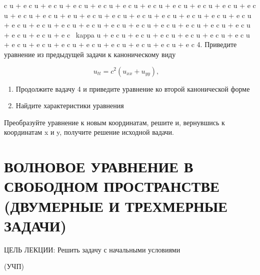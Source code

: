 \documentclass[
  ukrainian,
]{article}
\begin{document}
c \kappa u + e c \kappa u + e c \kappa u + e c \kappa u + e c \kappa u +
e c \kappa u + e c \kappa u + e c \kappa u + e c \kappa u + e c \kappa u
+ e c \kappa u + e c \kappa u + e c \kappa u + e u + e c \kappa u + e c
\kappa u + e c \kappa u + e c \kappa u + e c \kappa u + e c \kappa u + e
c \kappa u + e c \kappa u + e c \kappa u + e c \kappa u + e c \kappa u +
e c \kappa u + e c \kappa u + e c \kappa u + e c \kappa u + e c \kappa u
+ e c \kappa u + e c \kappa u + e c \kappa u + e c ~kappa u + e c
\kappa u + e c \kappa u + e c \kappa u + e c \kappa u + e c \kappa u + e
c \kappa u + e c \kappa u + e c \kappa u + e c \kappa u + e c \kappa u +
e c \kappa u + e c \kappa u + e c \kappa u + e c 4. Приведите уравнение
из предыдущей задачи к каноническому виду

\[
u_{tt} = c^2 (u_{xx} + u_{yy}), \quad
\]

\begin{enumerate}
\def\labelenumi{\arabic{enumi}.}
\setcounter{enumi}{4}
\item
  Продолжите вадачу 4 и приведите уравнение ко второй канонической форме
\item
  Найдите характеристики уравнения
\end{enumerate}

Преобразуйте уравнение к новым координатам, решите и, вернувшись к
координатам x и y, получите решение исходной вадачи.

\section{ВОЛНОВОЕ УРАВНЕНИЕ В СВОБОДНОМ ПРОСТРАНСТВЕ (ДВУМЕРНЫЕ И
ТРЕХМЕРНЫЕ
ЗАДАЧИ)}\label{ux432ux43eux43bux43dux43eux432ux43eux435-ux443ux440ux430ux432ux43dux435ux43dux438ux435-ux432-ux441ux432ux43eux431ux43eux434ux43dux43eux43c-ux43fux440ux43eux441ux442ux440ux430ux43dux441ux442ux432ux435-ux434ux432ux443ux43cux435ux440ux43dux44bux435-ux438-ux442ux440ux435ux445ux43cux435ux440ux43dux44bux435-ux437ux430ux434ux430ux447ux438}

ЦЕЛЬ ЛЕКЦИИ: Решить задачу с начальными условиями

(УЧП)
\end{document}
